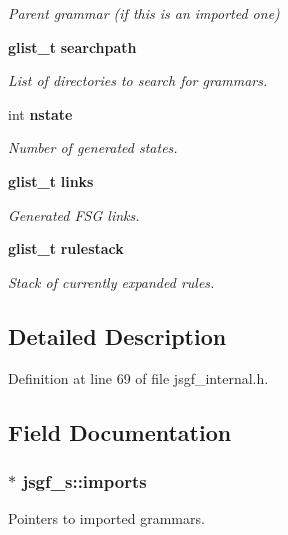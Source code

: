 \begin{DoxyCompactItemize}
\begin{DoxyCompactList}\small\item\em Parent grammar (if this is an imported one) \end{DoxyCompactList}\item 
{\bf glist\-\_\-t} {\bf searchpath}
\begin{DoxyCompactList}\small\item\em List of directories to search for grammars. \end{DoxyCompactList}\item 
int {\bf nstate}
\begin{DoxyCompactList}\small\item\em Number of generated states. \end{DoxyCompactList}\item 
{\bf glist\-\_\-t} {\bf links}
\begin{DoxyCompactList}\small\item\em Generated F\-S\-G links. \end{DoxyCompactList}\item 
{\bf glist\-\_\-t} {\bf rulestack}
\begin{DoxyCompactList}\small\item\em Stack of currently expanded rules. \end{DoxyCompactList}\end{DoxyCompactItemize}


\subsection{Detailed Description}


Definition at line 69 of file jsgf\-\_\-internal.\-h.



\subsection{Field Documentation}
\subsubsection[{imports}]{$\ast$ jsgf\-\_\-s\-::imports}\label{structjsgf__s_a7efd071684d4ef7f077b0b06ce7bbc78}


Pointers to imported grammars. 



